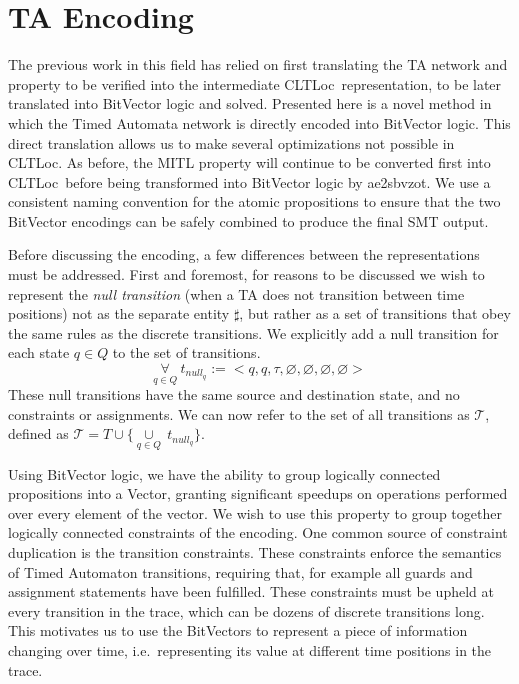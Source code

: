 \documentclass[a4paper,12pt]{article}
\newcommand{\cltloc}{CLTLoc}
\newcommand{\aez}{ae2sbvzot}
\begin{document}
\section{TA Encoding}\label{encoding}

The previous work in this field has relied on first translating the TA network
and property to be verified into the intermediate \cltloc\ representation, to be
later translated into BitVector logic and solved. Presented here is a novel
method in which the Timed Automata network is directly encoded into BitVector
logic. This direct translation allows us to make several optimizations not
possible in \cltloc. As before, the MITL property will continue to be converted
first into \cltloc\ before being transformed into BitVector logic by \aez. We
use a consistent naming convention for the atomic propositions to ensure that
the two BitVector encodings can be safely combined to produce the final SMT
output.

Before discussing the encoding, a few differences between the representations
must be addressed. First and foremost, for reasons to be discussed we wish to
represent the \emph{null transition} (when a TA does not transition between time
positions) not as the separate entity \(\sharp\), but rather as a set of
transitions that obey the same rules as the discrete transitions. We explicitly
add a null transition for each state \(q \in Q\) to the set of transitions.
\[\underset{q \in Q}{\forall}\ t_{null_q} := {<}q, q, \tau, \varnothing, \varnothing, \varnothing, \varnothing {>}\]
These null transitions have the same source and destination state, and no
constraints or assignments. We can now refer to the set of all transitions as
\(\mathcal{T}\), defined as
\(\mathcal{T} = T \cup \{\underset{q \in Q}{\cup}\ t_{null_q}\}\).


Using BitVector logic, we have the ability to group logically connected
propositions into a Vector, granting significant speedups on operations
performed over every element of the vector. We wish to use this property to
group together logically connected constraints of the encoding. One common
source of constraint duplication is the transition constraints. These
constraints enforce the semantics of Timed Automaton transitions, requiring
that, for example all guards and assignment statements have been fulfilled.
These constraints must be upheld at every transition in the trace, which can be
dozens of discrete transitions long. This motivates us to use the BitVectors to
represent a piece of information changing over time, i.e.\ representing its value
at different time positions in the trace.
\end{document}
